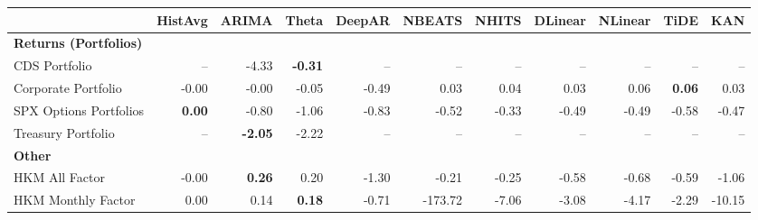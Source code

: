 \scriptsize
\setlength{\tabcolsep}{1.5pt}
\renewcommand{\arraystretch}{0.9}
\begin{tabular}{@{}lrrrrrrrrrr@{}}
\toprule
 & HistAvg & ARIMA & Theta & DeepAR & NBEATS & NHITS & DLinear & NLinear & TiDE & KAN \\
\midrule
\multicolumn{11}{l}{\textbf{Returns (Portfolios)}} \\
CDS Portfolio & -- & -4.33 & \textbf{-0.31} & -- & -- & -- & -- & -- & -- & -- \\
Corporate Portfolio & -0.00 & -0.00 & -0.05 & -0.49 & 0.03 & 0.04 & 0.03 & 0.06 & \textbf{0.06} & 0.03 \\
SPX Options Portfolios & \textbf{0.00} & -0.80 & -1.06 & -0.83 & -0.52 & -0.33 & -0.49 & -0.49 & -0.58 & -0.47 \\
Treasury Portfolio & -- & \textbf{-2.05} & -2.22 & -- & -- & -- & -- & -- & -- & -- \\
\midrule
\multicolumn{11}{l}{\textbf{Other}} \\
HKM All Factor & -0.00 & \textbf{0.26} & 0.20 & -1.30 & -0.21 & -0.25 & -0.58 & -0.68 & -0.59 & -1.06 \\
HKM Monthly Factor & 0.00 & 0.14 & \textbf{0.18} & -0.71 & -173.72 & -7.06 & -3.08 & -4.17 & -2.29 & -10.15 \\
\bottomrule
\end{tabular}